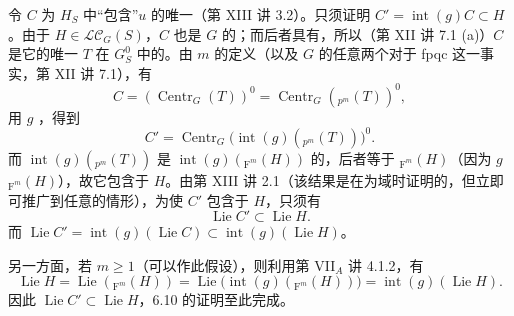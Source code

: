 令 $C$ 为 $H_S$ 中“包含”$u$ 的唯一（第 XIII 讲 3.2）。只须证明 $C'=\operatorname{int}(g)C\subset H$。由于 $H\in\mathscr L\mathscr C_G(S)$，$C$ 也是 $G$ 的；而后者具有，所以（第 XII 讲 7.1 (a)）$C$ 是它的唯一 $T$ 在 $G_S^0$ 中的。由 $m$ 的定义（以及 $G$ 的任意两个对于 fpqc 这一事实，第 XII 讲 7.1），有
\[C=(\operatorname{Centr}_G(T))^0=\operatorname{Centr}_G({}_{p^m}(T))^0,\]
用 $g$ ，得到
\[C'=\operatorname{Centr}_G\bigl(\operatorname{int}(g)({}_{p^m}(T))\bigr)^0.\]
而 $\operatorname{int}(g)({}_{p^m}(T))$ 是 $\operatorname{int}(g)({}_{\mathrm F^m}(H))$ 的，后者等于 ${}_{\mathrm F^m}(H)$（因为 $g$  ${}_{\mathrm F^m}(H)$），故它包含于 $H$。由第 XIII 讲 2.1（该结果是在为域时证明的，但立即可推广到任意的情形），为使 $C'$ 包含于 $H$，只须有
\[\operatorname{Lie}C'\subset\operatorname{Lie}H.\]
而 $\operatorname{Lie}C'=\operatorname{int}(g)(\operatorname{Lie}C)\subset\operatorname{int}(g)(\operatorname{Lie}H)$。

另一方面，若 $m\geq1$（可以作此假设），则利用第 VII$_A$ 讲 4.1.2，有
\[\operatorname{Lie}H=\operatorname{Lie}({}_{\mathrm F^m}(H))=\operatorname{Lie}\bigl(\operatorname{int}(g)({}_{\mathrm F^m}(H))\bigr)=\operatorname{int}(g)(\operatorname{Lie}H).\]
因此 $\operatorname{Lie}C'\subset\operatorname{Lie}H$，6.10 的证明至此完成。

